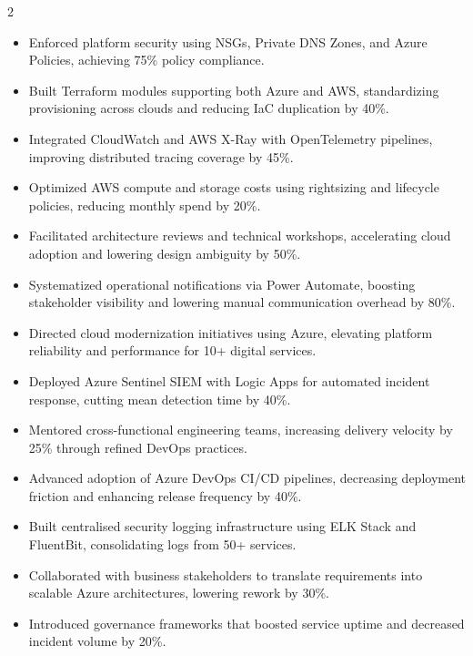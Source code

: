\documentclass[10pt,a4paper,withhyper]{altacv}
\begin{document}
\begin{paracol}{2}
\begin{justify}
\begin{itemize}
    \item Enforced platform security using NSGs, Private DNS Zones, and Azure Policies, achieving 75\% policy compliance.
    \item Built Terraform modules supporting both Azure and AWS, standardizing provisioning across clouds and reducing IaC duplication by 40\%.
    \item Integrated CloudWatch and AWS X-Ray with OpenTelemetry pipelines, improving distributed tracing coverage by 45\%.
    \item Optimized AWS compute and storage costs using rightsizing and lifecycle policies, reducing monthly spend by 20\%.
    \item Facilitated architecture reviews and technical workshops, accelerating cloud adoption and lowering design ambiguity by 50\%.
    \item Systematized operational notifications via Power Automate, boosting stakeholder visibility and lowering manual communication overhead by 80\%.

\end{itemize}
\end{justify}
\divider

\begin{justify}
\begin{itemize}

    \item Directed cloud modernization initiatives using Azure, elevating platform reliability and performance for 10+ digital services.
    \item Deployed Azure Sentinel SIEM with Logic Apps for automated incident response, cutting mean detection time by 40\%.
    \item Mentored cross-functional engineering teams, increasing delivery velocity by 25\% through refined DevOps practices.
    \item Advanced adoption of Azure DevOps CI/CD pipelines, decreasing deployment friction and enhancing release frequency by 40\%.
    \item Built centralised security logging infrastructure using ELK Stack and FluentBit, consolidating logs from 50+ services.
    \item Collaborated with business stakeholders to translate requirements into scalable Azure architectures, lowering rework by 30\%.
    \item Introduced governance frameworks that boosted service uptime and decreased incident volume by 20\%.
    

\end{itemize}
\end{justify}
\end{paracol}
\end{document}
